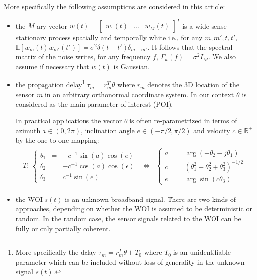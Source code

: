 \documentclass[graybox]{svmult/styles/svmult}
\newcommand{\esp}[1]{\mathds{E}\left[ #1 \right]}
\begin{document}
More specifically the following assumptions are considered in this article:
\begin{itemize}
\item
the $M$-ary vector 
$w(t)=\begin{bmatrix}
w_{1}(t)&\ldots&w_{M}(t)\end{bmatrix}^{T}$ is a wide sense stationary process spatially and temporally white i.e., for any $m,m',t,t'$, $\esp{w_{m}(t)w_{m'}(t')}=\sigma^{2}\delta(t-t')\delta_{m-m'}$. It follows that the spectral matrix of the noise writes, for any frequency $f$, $\Gamma_{w}(f)=\sigma^{2}I_{M}$. We also assume if necessary that $w(t)$ is Gaussian.
\item
the propagation delay\footnote{More specifically the delay $\tau_{m}=r_{m}^{T}\theta+T_{0}$ where $T_{0}$ is an unidentifiable parameter which can be included without loss of generality in the unknown signal $s(t)$.}  $\tau_{m}=r_{m}^{T}\theta$ where $r_{m}$ denotes the 3D location of the sensor $m$  in an arbitrary orthonormal  coordinate system.  In our context $\theta$ is considered as the main parameter of interest (POI).

In practical applications the vector $\theta$ is often re-parametrized in terms of azimuth $a\in(0,2\pi)$, inclination angle $e\in(-\pi/2,\pi/2)$ and velocity $c\in\mathds{R}^{+}$ by the one-to-one mapping:
\begin{eqnarray}
 \label{eq:aec}
 \begin{array}{ccc}
 T:\,
  \left\{
  \begin{array}{rcl}
 \theta_{1}&=&-c^{-1} \sin(a)\cos(e)\\
 \theta_{2}&=&-c^{-1} \cos(a)\cos(e)\\
 \theta_{3}&=&c^{-1} \sin(e)
 \end{array}
 \right.
&
\Leftrightarrow
&
  \left\{
  \begin{array}{rcl}
a&=&\arg (-\theta_{2}-j\theta_{1})\\
c&=&(\theta_{1}^2+\theta_{2}^2+\theta_{3}^2)^{-1/2}\\
e&=&\arg \sin(c\theta_{3})
 \end{array}
 \right.
 \end{array}
\end{eqnarray}
\item
the WOI $s(t)$ is an unknown broadband signal. There are two kinds of approaches, depending on whether the WOI is assumed to be deterministic or random. In the random case, the sensor signals related to the WOI can be fully or only partially coherent.



\end{itemize}
\end{document}
